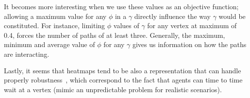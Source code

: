 It becomes more interesting when we use these values as an objective function; allowing a maximum value for any \(\phi\) in a \(\gamma\) directly influence the way \(\gamma\) would be constituted. For instance, limiting \(\phi\) values of \(\gamma\) for any vertex at maximum of 0.4, forces the number of paths of at least three. Generally, the maximum, minimum and average value of \(\phi\) for any \(\gamma\) gives us information on how the paths are interacting. 

Lastly, it seems that heatmaps tend to be also a representation that can handle properly robustness~\cite{atstfestko20a}, which correspond to the fact that agents can time to time wait at a vertex (mimic an unpredictable problem for realistic scenarios).






